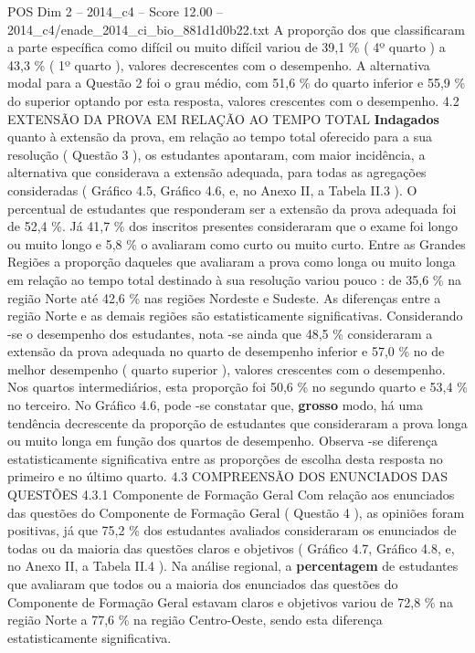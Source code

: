 \begin{textsample}{POS Dim 2 – 2014\_c4 – Score 12.00 – 2014\_c4/enade\_2014\_ci\_bio\_881d1d0b22.txt}
A proporção dos que classificaram a parte específica como difícil ou muito difícil variou de 39,1 \% ( 4º quarto ) a 43,3 \% ( 1º quarto ), valores decrescentes com o desempenho.
A alternativa modal para a Questão 2 foi o grau médio, com 51,6 \% do quarto inferior e 55,9 \% do superior optando por esta resposta, valores crescentes com o desempenho. 4.2 EXTENSÃO DA PROVA EM RELAÇÃO AO TEMPO TOTAL \textbf{Indagados} quanto à extensão da prova, em relação ao tempo total oferecido para a sua resolução ( Questão 3 ), os estudantes apontaram, com maior incidência, a alternativa que considerava a extensão adequada, para todas as agregações consideradas ( Gráfico 4.5, Gráfico 4.6, e, no Anexo II, a Tabela II.3 ).
O percentual de estudantes que responderam ser a extensão da prova adequada foi de 52,4 \%.
Já 41,7 \% dos inscritos presentes consideraram que o exame foi longo ou muito longo e 5,8 \% o avaliaram como curto ou muito curto.
Entre as Grandes Regiões a proporção daqueles que avaliaram a prova como longa ou muito longa em relação ao tempo total destinado à sua resolução variou pouco : de 35,6 \% na região Norte até 42,6 \% nas regiões Nordeste e Sudeste.
As diferenças entre a região Norte e as demais regiões são estatisticamente significativas.
Considerando -se o desempenho dos estudantes, nota -se ainda que 48,5 \% consideraram a extensão da prova adequada no quarto de desempenho inferior e 57,0 \% no de melhor desempenho ( quarto superior ), valores crescentes com o desempenho.
Nos quartos intermediários, esta proporção foi 50,6 \% no segundo quarto e 53,4 \% no terceiro.
No Gráfico 4.6, pode -se constatar que, \textbf{grosso} modo, há uma tendência decrescente da proporção de estudantes que consideraram a prova longa ou muito longa em função dos quartos de desempenho.
Observa -se diferença estatisticamente significativa entre as proporções de escolha desta resposta no primeiro e no último quarto. 4.3 COMPREENSÃO DOS ENUNCIADOS DAS QUESTÕES 4.3.1 Componente de Formação Geral Com relação aos enunciados das questões do Componente de Formação Geral ( Questão 4 ), as opiniões foram positivas, já que 75,2 \% dos estudantes avaliados consideraram os enunciados de todas ou da maioria das questões claros e objetivos ( Gráfico 4.7, Gráfico 4.8, e, no Anexo II, a Tabela II.4 ).
Na análise regional, a \textbf{percentagem} de estudantes que avaliaram que todos ou a maioria dos enunciados das questões do Componente de Formação Geral estavam claros e objetivos variou de 72,8 \% na região Norte a 77,6 \% na região Centro-Oeste, sendo esta diferença estatisticamente significativa.

\end{textsample}

